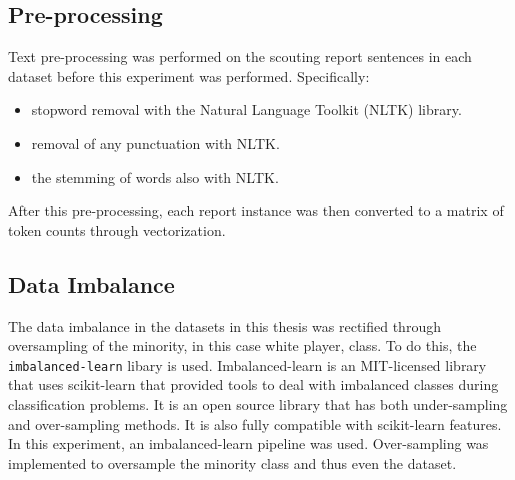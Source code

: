 \documentclass[oneside,12pt]{Classes/RoboticsLaTeX}
\begin{document}
\subsection{Pre-processing}
Text pre-processing was performed on the scouting report sentences in each dataset before this experiment was performed.
Specifically:
\begin{itemize}
  \item stopword removal with the Natural Language Toolkit (NLTK) library.
  \item removal of any punctuation with NLTK.
  \item the stemming of words also with NLTK.
\end{itemize}
After this pre-processing, each report instance was then converted to a matrix of token counts through vectorization.

\subsection{Data Imbalance}
The data imbalance in the datasets in this thesis was rectified through oversampling of the minority, in this case white player, class. To do this, the \texttt{imbalanced-learn} libary \citep{imb-learn} is used.
Imbalanced-learn is an MIT-licensed library that uses scikit-learn that provided tools to deal with imbalanced classes during classification problems. It is an open source library that has
both under-sampling and over-sampling methods. It is also fully compatible with scikit-learn features. In this experiment, an imbalanced-learn pipeline was used. Over-sampling was implemented to oversample
the minority class and thus even the dataset.
\end{document}

